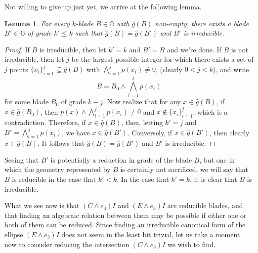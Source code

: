 \documentclass{birkjour}
\newtheorem{lem}[thm]{Lemma}
\theoremstyle{definition}
\theoremstyle{remark}
\numberwithin{equation}{section}
\newcommand{\G}{\mathbb{G}}
\newcommand{\gh}{\hat{g}}
\begin{document}
Not willing to give up just yet, we arrive at the following lemma.

\begin{lem}\label{lma_irreducible_form_exists}
For every $k$-blade $B\in\G$ with $\gh(B)$ non-empty, there exists a blade $B'\in\G$ of grade $k'\leq k$
such that $\gh(B)=\gh(B')$ and $B'$ is irreducible.
\end{lem}
\begin{proof}
If $B$ is irreducible, then let $k'=k$ and $B'=B$ and we're done.
If $B$ is not irreducible, then let $j$ be the largest possible integer
for which there exists a set of $j$ points $\{x_i\}_{i=1}^j\subseteq\gh(B)$
with $\bigwedge_{i=1}^j p(x_i)\neq 0$, (clearly $0<j<k$), and write
\begin{equation*}
B = B_0\wedge\bigwedge_{i=1}^j p(x_i)
\end{equation*}
for some blade $B_0$ of grade $k-j$.  Now realize that for any $x\in\gh(B)$,
if $x\in\gh(B_0)$, then $p(x)\wedge\bigwedge_{i=1}^j p(x_i)\neq 0$ and $x\not\in\{x_i\}_{i=1}^j$,
which is a contradiction.  Therefore, if $x\in\gh(B)$, then, letting $k'=j$ and $B'=\bigwedge_{i=1}^jp(x_i)$,
we have $x\in\gh(B')$.  Conversely, if $x\in\gh(B')$, then clearly $x\in\gh(B)$.  It follows that
$\gh(B)=\gh(B')$ and $B'$ is irreducible.
\end{proof}

Seeing that $B'$ is potentially a reduction in grade of the blade $B$, but one
in which the geometry represented by $B$ is certainly not sacrificed,
we will say that $B$ is reducible
in the case that $k'<k$.  In the case that $k'=k$, it is clear that $B$ is irreducible.

What we see now is that $(C\wedge e_3)I$ and $(E\wedge e_3)I$ are reducible blades,
and that finding an algebraic relation between them may be possible if either
one or both of them can be reduced.  Since finding an
irreducible canonical form of the ellipse $(E\wedge e_3)I$
does not seem in the least bit trivial, let us take a moment now to consider reducing the
intersection $(C\wedge e_3)I$ we wish to find.
\end{document}
